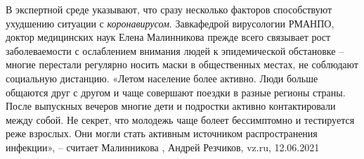 В экспертной среде указывают, что сразу несколько факторов способствуют
ухудшению ситуации с \emph{коронавирусом}. Завкафедрой вирусологии РМАНПО,
доктор медицинских наук Елена Малинникова прежде всего связывает рост
заболеваемости с ослаблением внимания людей к эпидемической обстановке – многие
перестали регулярно носить маски в общественных местах, не соблюдают социальную
дистанцию. «Летом население более активно. Люди больше общаются друг с другом и
чаще совершают поездки в разные регионы страны. После выпускных вечеров многие
дети и подростки активно контактировали между собой. Не секрет, что молодежь
чаще болеет бессимптомно и тестируется реже взрослых. Они могли стать активным
источником распространения инфекции», – считает Малинникова
, Андрей Резчиков, vz.ru, 12.06.2021
